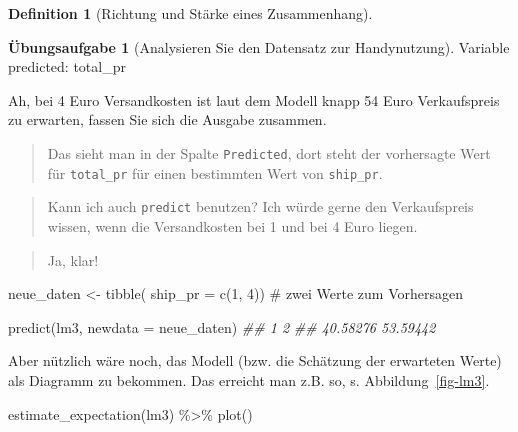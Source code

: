 \documentclass[
  a4paper,
  DIV=11]{scrreprt}
\newenvironment{Shaded}{\begin{snugshade}}{\end{snugshade}}
\newcommand{\AttributeTok}[1]{\textcolor[rgb]{0.40,0.45,0.13}{#1}}
\newcommand{\CommentTok}[1]{\textcolor[rgb]{0.37,0.37,0.37}{#1}}
\newcommand{\DecValTok}[1]{\textcolor[rgb]{0.68,0.00,0.00}{#1}}
\newcommand{\DocumentationTok}[1]{\textcolor[rgb]{0.37,0.37,0.37}{\textit{#1}}}
\newcommand{\FunctionTok}[1]{\textcolor[rgb]{0.28,0.35,0.67}{#1}}
\newcommand{\NormalTok}[1]{\textcolor[rgb]{0.00,0.23,0.31}{#1}}
\newcommand{\OtherTok}[1]{\textcolor[rgb]{0.00,0.23,0.31}{#1}}
\newcommand{\SpecialCharTok}[1]{\textcolor[rgb]{0.37,0.37,0.37}{#1}}
\theoremstyle{definition}
\newtheorem{exercise}{Übungsaufgabe}[chapter]
\theoremstyle{definition}
\theoremstyle{definition}
\newtheorem{definition}{Definition}[chapter]
\theoremstyle{remark}
\begin{document}
\begin{definition}[Richtung und Stärke eines
Zusammenhang]
\begin{exercise}[Analysieren Sie den Datensatz zur
Handynutzung]
Variable predicted: total\_pr

Ah, bei 4 Euro Versandkosten ist laut dem Modell knapp 54 Euro
Verkaufspreis zu erwarten, fassen Sie sich die Ausgabe zusammen.

\begin{quote}
{} Das sieht man in der Spalte \texttt{Predicted}, dort
steht der vorhersagte Wert für \texttt{total\_pr} für einen bestimmten
Wert von \texttt{ship\_pr}.
\end{quote}

\begin{quote}
{} Kann ich auch \texttt{predict} benutzen? Ich würde
gerne den Verkaufspreis wissen, wenn die Versandkosten bei 1 und bei 4
Euro liegen.
\end{quote}

\begin{quote}
{} Ja, klar!
\end{quote}

\begin{Shaded}
\begin{Highlighting}[]
\NormalTok{neue\_daten }\OtherTok{\textless{}{-}} \FunctionTok{tibble}\NormalTok{(}
  \AttributeTok{ship\_pr =} \FunctionTok{c}\NormalTok{(}\DecValTok{1}\NormalTok{, }\DecValTok{4}\NormalTok{)) }\CommentTok{\# zwei Werte zum Vorhersagen}
\end{Highlighting}
\end{Shaded}

\begin{Shaded}
\begin{Highlighting}[]
\FunctionTok{predict}\NormalTok{(lm3, }\AttributeTok{newdata =}\NormalTok{ neue\_daten)}
\DocumentationTok{\#\#        1        2 }
\DocumentationTok{\#\# 40.58276 53.59442}
\end{Highlighting}
\end{Shaded}

Aber nützlich wäre noch, das Modell (bzw. die Schätzung der erwarteten
Werte) als Diagramm zu bekommen. Das erreicht man z.B. so, s.
Abbildung~\ref{fig-lm3}.

\begin{Shaded}
\begin{Highlighting}[]
\FunctionTok{estimate\_expectation}\NormalTok{(lm3) }\SpecialCharTok{\%\textgreater{}\%} \FunctionTok{plot}\NormalTok{()}
\end{Highlighting}
\end{Shaded}

\begin{figure}[H]


\end{figure}
\end{exercise}
\end{definition}
\end{document}
